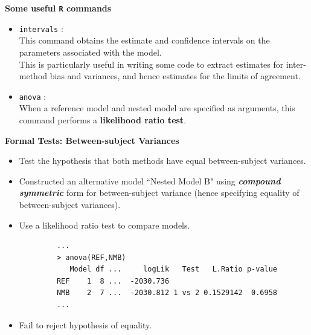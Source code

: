 \documentclass[compress]{beamer}        %
\makeatletter
\newcommand{\tcb}{\textcolor{beamer@blendedblue}}
\makeatother
\begin{document}
		\begin{frame}{\bf \tcb{Some useful \texttt{R} commands}}
			\large
			\begin{itemize}
				
				\item \texttt{intervals} :\vspace{0.25cm} \\This command obtains the estimate and confidence intervals on the parameters associated with the model.\\
				This is particularly useful in writing some code to extract estimates for inter-method bias and variances, and hence estimates for the limits of agreement.
				
				\item \texttt{anova} : \vspace{0.25cm} \\When a reference model and nested model are specified as arguments, this command performs a \textbf{likelihood ratio test}.
			\end{itemize}
		\end{frame}
		
		
		\begin{frame}[fragile]{\bf \tcb{Formal Tests: Between-subject Variances}}
			\begin{itemize}
				\item Test the hypothesis that both methods have equal between-subject variances.
				\item Constructed an alternative model ``Nested Model B" using \textbf{\emph{compound symmetric}} form for between-subject variance (hence specifying equality of between-subject variances).
				\item Use a likelihood ratio test to compare models.
			\end{itemize}
			\begin{verbatim}
			...
			> anova(REF,NMB)
			   Model df ...     logLik   Test   L.Ratio p-value
			REF    1  8 ...  -2030.736
			NMB    2  7 ...  -2030.812 1 vs 2 0.1529142  0.6958
			...
			\end{verbatim}
			\begin{itemize}
				\item Fail to reject hypothesis of equality.
			\end{itemize}
		\end{frame}
		
\end{document}
